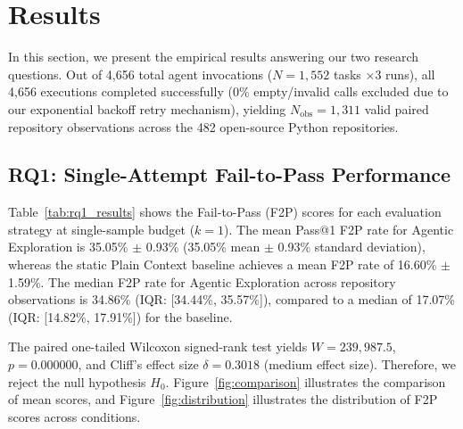 \section{Results}
\label{sec:results}

In this section, we present the empirical results answering our two research questions. Out of 4,656 total agent invocations ($N=1,552$ tasks $\times 3$ runs), all 4,656 executions completed successfully (0\% empty/invalid calls excluded due to our exponential backoff retry mechanism), yielding $N_{\text{obs}} = 1,311$ valid paired repository observations across the 482 open-source Python repositories.

\subsection{RQ1: Single-Attempt Fail-to-Pass Performance}
\label{subsec:rq1}

Table~\ref{tab:rq1_results} shows the Fail-to-Pass (F2P) scores for each evaluation strategy at single-sample budget ($k=1$). The mean Pass@1 F2P rate for Agentic Exploration is 35.05\% $\pm$ 0.93\% (35.05\% mean $\pm$ 0.93\% standard deviation), whereas the static Plain Context baseline achieves a mean F2P rate of 16.60\% $\pm$ 1.59\%. The median F2P rate for Agentic Exploration across repository observations is 34.86\% (IQR: [34.44\%, 35.57\%]), compared to a median of 17.07\% (IQR: [14.82\%, 17.91\%]) for the baseline.

The paired one-tailed Wilcoxon signed-rank test yields $W = 239,987.5$, $p = 0.000000$, and Cliff's effect size $\delta = 0.3018$ (medium effect size). Therefore, we reject the null hypothesis $H_0$. Figure~\ref{fig:comparison} illustrates the comparison of mean scores, and Figure~\ref{fig:distribution} illustrates the distribution of F2P scores across conditions.

\begin{table}[t]
\centering
\caption{FAIL-TO-PASS PERFORMANCE COMPARISON (RQ1: $k=1$ SINGLE-SAMPLE BUDGET)}
\label{tab:rq1_results}
\end{table}

